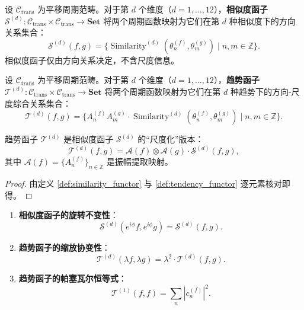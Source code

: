 \begin{definition}[相似度函子]\label{def:similarity_functor}
设 $\mathcal{C}_{\text{trans}}$ 为平移周期范畴。对于第 $d$ 个维度（$d = 1,\dots,12$），\textbf{相似度函子} $\mathcal{S}^{(d)}: \mathcal{C}_{\text{trans}} \times \mathcal{C}_{\text{trans}} \to \mathbf{Set}$ 将两个周期函数映射为它们在第 $d$ 种相似度下的方向关系集合：
\[
\mathcal{S}^{(d)}(f, g) = \{\operatorname{Similarity}^{(d)}(\theta_n^{(f)}, \theta_m^{(g)}) \mid n, m \in \mathbb{Z}\}.
\]
相似度函子仅由方向关系决定，不含尺度信息。
\end{definition}

\begin{definition}[趋势函子]\label{def:tendency_functor}
设 $\mathcal{C}_{\text{trans}}$ 为平移周期范畴。对于第 $d$ 个维度（$d = 1,\dots,12$），\textbf{趋势函子} $\mathcal{T}^{(d)}: \mathcal{C}_{\text{trans}} \times \mathcal{C}_{\text{trans}} \to \mathbf{Set}$ 将两个周期函数映射为它们在第 $d$ 种趋势下的方向-尺度综合关系集合：
\[
\mathcal{T}^{(d)}(f, g) = \{A_n^{(f)} A_m^{(g)} \cdot \operatorname{Similarity}^{(d)}(\theta_n^{(f)}, \theta_m^{(g)}) \mid n, m \in \mathbb{Z}\}.
\]
\end{definition}

\begin{proposition}[相似度函子与趋势函子的关系]\label{prop:similarity_tendency_functor_relation}
趋势函子 $\mathcal{T}^{(d)}$ 是相似度函子 $\mathcal{S}^{(d)}$ 的“尺度化”版本：
\[
\mathcal{T}^{(d)}(f, g) = \mathcal{A}(f) \otimes \mathcal{A}(g) \cdot \mathcal{S}^{(d)}(f, g),
\]
其中 $\mathcal{A}(f) = \{A_n^{(f)}\}_{n \in \mathbb{Z}}$ 是振幅提取映射。
\end{proposition}

\begin{proof}
由定义 \ref{def:similarity_functor} 与 \ref{def:tendency_functor} 逐元素核对即得。
\end{proof}

\begin{proposition}[相似度函子与趋势函子的守恒律]
\label{prop:similarity_tendency_conservation}
\begin{enumerate}[label=(\roman*)]
    \item \textbf{相似度函子的旋转不变性}：
    \[
    \mathcal{S}^{(d)}(e^{i\phi} f, e^{i\phi} g)
    = \mathcal{S}^{(d)}(f, g).
    \]

    \item \textbf{趋势函子的缩放协变性}：
    \[
    \mathcal{T}^{(d)}(\lambda f, \lambda g)
    = \lambda^2 \cdot \mathcal{T}^{(d)}(f, g).
    \]

    \item \textbf{趋势函子的帕塞瓦尔恒等式}：
    \[
    \mathcal{T}^{(1)}(f, f) = \sum_n |c_n^{(f)}|^2.
    \]
\end{enumerate}
\end{proposition}

